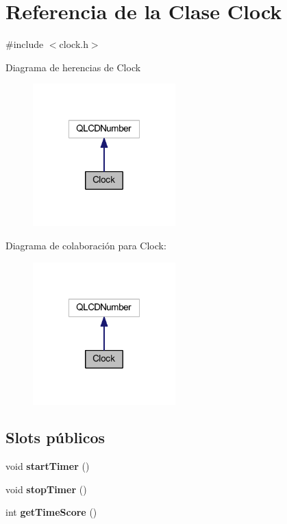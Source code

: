 \section{Referencia de la Clase Clock}
\label{class_clock}


{\ttfamily \#include $<$clock.\-h$>$}



Diagrama de herencias de Clock
\nopagebreak
\begin{figure}[H]
\begin{center}
\leavevmode
\includegraphics[width=156pt]{class_clock__inherit__graph}
\end{center}
\end{figure}


Diagrama de colaboración para Clock\-:
\nopagebreak
\begin{figure}[H]
\begin{center}
\leavevmode
\includegraphics[width=156pt]{class_clock__coll__graph}
\end{center}
\end{figure}
\subsection*{Slots públicos}
\begin{DoxyCompactItemize}
\item 
void {\bf start\-Timer} ()
\item 
void {\bf stop\-Timer} ()
\item 
int {\bf get\-Time\-Score} ()
\end{DoxyCompactItemize}
